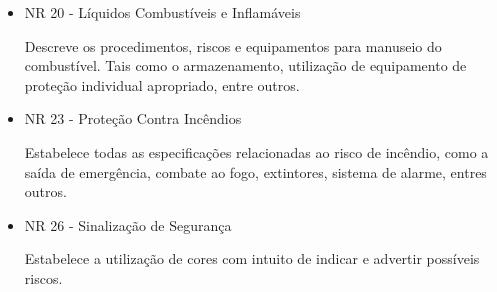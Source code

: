 \begin{itemize}
	\item NR 20 - Líquidos Combustíveis e Inflamáveis

	Descreve os procedimentos, riscos e equipamentos para manuseio do combustível. Tais como o armazenamento, utilização de equipamento de proteção individual apropriado, entre outros.

	\item NR 23 - Proteção Contra Incêndios

	Estabelece todas as especificações relacionadas ao risco de incêndio, como a saída de emergência, combate ao fogo, extintores, sistema de alarme, entres outros.

	\item NR 26 - Sinalização de Segurança

	Estabelece a utilização de cores com intuito de indicar e advertir possíveis riscos.

\end{itemize}







